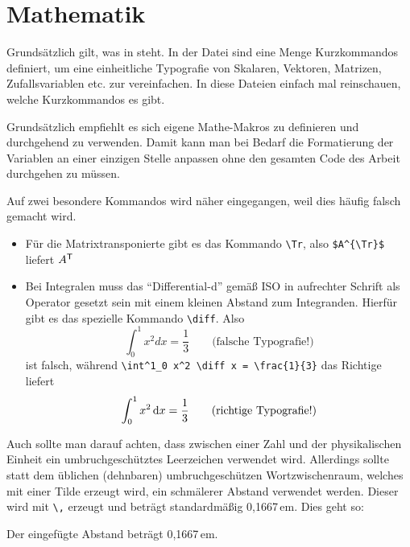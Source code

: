 \section{Mathematik}%
\label{sec:Mathe}
%
Grundsätzlich gilt, was in \parencites{ams1999a}{ams1999b} steht. In der Datei
 sind eine Menge Kurzkommandos definiert,
um eine einheitliche Typografie von
Skalaren, Vektoren, Matrizen,
Zufallsvariablen etc. zur vereinfachen.
In diese Dateien einfach mal reinschauen, welche Kurzkommandos es gibt.

Grundsätzlich empfiehlt es sich eigene Mathe-Makros zu definieren und durchgehend zu verwenden.
Damit kann man bei Bedarf die Formatierung der Variablen an einer einzigen Stelle anpassen
ohne den gesamten Code des Arbeit durchgehen zu müssen.

Auf zwei besondere Kommandos wird näher eingegangen,
weil dies häufig falsch gemacht wird.
\begin{itemize}
  \item Für die Matrixtransponierte gibt es das Kommando \verb#\Tr#, also
	\verb#$A^{\Tr}$# liefert $A^{\mathsf{T}}$
	
	\item Bei Integralen muss das \enquote{Differential-d} gemäß
	ISO in aufrechter Schrift als Operator gesetzt sein mit einem kleinen Abstand
	zum Integranden. Hierfür gibt es das spezielle Kommando \verb#\diff#. Also
	\begin{equation}
	 \int^1_0 x^2 d x = \frac{1}{3} \qquad \text{(falsche Typografie!)}
	\end{equation}
	ist falsch, während \verb#\int^1_0 x^2 \diff x = \frac{1}{3}# das Richtige
	liefert
	\begin{equation}
	 \int^1_0 x^2 \mathop{}\!\mathrm{d} x = \frac{1}{3} \qquad \text{(richtige Typografie!)}
	\end{equation}
\end{itemize}

Auch sollte man darauf achten, dass zwischen einer Zahl und der physikalischen Einheit ein umbruchgeschütztes Leerzeichen verwendet wird.
Allerdings sollte statt dem üblichen (dehnbaren) umbruchgeschützen Wortzwischenraum, 
welches mit einer Tilde erzeugt wird, ein schmälerer Abstand verwendet werden.
Dieser wird mit \verb+\,+  erzeugt und beträgt standardmäßig 0,1667\,em. Dies geht so:
\begin{latex}
Der eingefügte Abstand beträgt 0,1667\,em.
\end{latex}